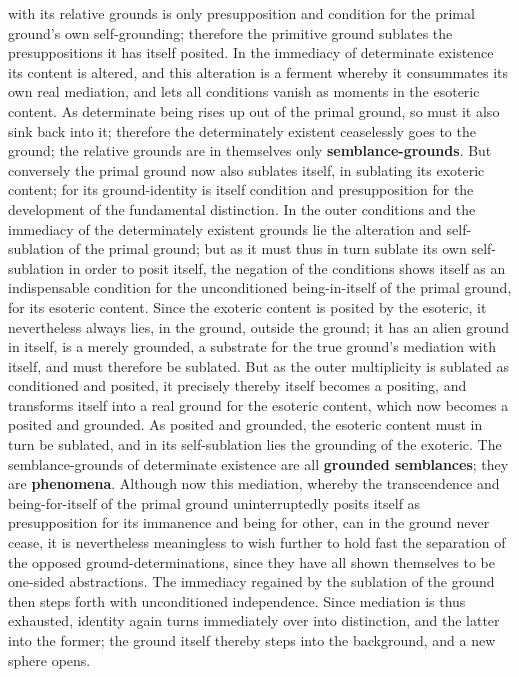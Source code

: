 \documentclass[12pt,a4paper,openany]{book}
\newcommand{\opage}[1]{\marginnote{\footnotesize\textit{[#1]}}}
\begin{document}
with its relative grounds is only presupposition
and condition for the primal ground's own self-grounding;
therefore the primitive ground sublates the
presuppositions it has itself posited. In the %
\setcounter{footnote}{0}%
\opage{139}immediacy of determinate existence its content is altered, and this
alteration is a ferment whereby it consummates
its own real mediation, and lets all conditions
vanish as moments in the esoteric content.
As determinate being rises up out of the primal ground, so
must it also sink back into it; therefore
the determinately existent ceaselessly goes to the ground; the relative
grounds are in themselves only \textbf{semblance-grounds}. But
conversely the primal ground now also sublates itself, in
sublating its exoteric content; for its ground-identity
is itself condition and presupposition
for the development of the fundamental distinction.
In the outer conditions and the immediacy of the determinately existent grounds
lie the alteration and self-sublation of the primal ground; but as it must thus in turn
sublate its own self-sublation in order to posit itself,
the negation of the conditions shows itself as
an indispensable condition for the unconditioned
being-in-itself of the primal ground, for its esoteric content. Since
the exoteric content is posited by the esoteric, it
nevertheless always lies, in the ground, outside the ground;
it has an alien ground in itself, is a merely grounded,
a substrate for the true ground's mediation
with itself, and must therefore be sublated.
But as the outer multiplicity is sublated as
conditioned and posited, it precisely thereby itself becomes a
positing, and transforms itself into a real ground for
the esoteric content, which now becomes a posited and
grounded. As posited and grounded, the esoteric
content must in turn be sublated, and in its self-sublation
lies the grounding of the exoteric. The semblance-grounds
of determinate existence are all \textbf{grounded semblances};
they are \textbf{phenomena}.
\setcounter{footnote}{0}%
\opage{140}Although now this mediation, whereby the transcendence
and being-for-itself of the primal ground uninterruptedly posits itself
as presupposition for its immanence and being
for other, can in the ground never cease, it is
nevertheless meaningless to wish further to hold fast
the separation of the opposed ground-determinations, since
they have all shown themselves to be one-sided abstractions.
The immediacy regained by the sublation of the ground then steps forth with unconditioned independence.
Since mediation is thus exhausted,
identity again turns immediately over into
distinction, and the latter into the former; the ground itself thereby steps into the background, and a new sphere opens.
\end{document}
